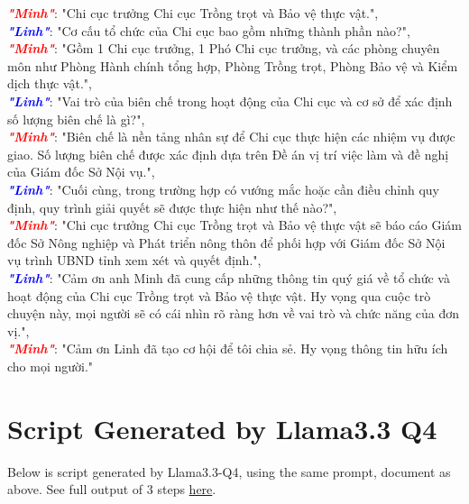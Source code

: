 \documentclass[12pt]{article}
\begin{document}
{\begin{minipage}{\textwidth}
\textcolor{red}{\textbf{\textit{"Minh"}}}: "Chi cục trưởng Chi cục Trồng trọt và Bảo vệ thực vật.",\\
\textcolor{blue}{\textbf{\textit{"Linh"}}}: "Cơ cấu tổ chức của Chi cục bao gồm những thành phần nào?",\\
\textcolor{red}{\textbf{\textit{"Minh"}}}: "Gồm 1 Chi cục trưởng, 1 Phó Chi cục trưởng, và các phòng chuyên môn như Phòng Hành chính tổng hợp, Phòng Trồng trọt, Phòng Bảo vệ và Kiểm dịch thực vật.",\\
\textcolor{blue}{\textbf{\textit{"Linh"}}}: "Vai trò của biên chế trong hoạt động của Chi cục và cơ sở để xác định số lượng biên chế là gì?",\\
\textcolor{red}{\textbf{\textit{"Minh"}}}: "Biên chế là nền tảng nhân sự để Chi cục thực hiện các nhiệm vụ được giao. Số lượng biên chế được xác định dựa trên Đề án vị trí việc làm và đề nghị của Giám đốc Sở Nội vụ.",\\
\textcolor{blue}{\textbf{\textit{"Linh"}}}: "Cuối cùng, trong trường hợp có vướng mắc hoặc cần điều chỉnh quy định, quy trình giải quyết sẽ được thực hiện như thế nào?",\\
\textcolor{red}{\textbf{\textit{"Minh"}}}: "Chi cục trưởng Chi cục Trồng trọt và Bảo vệ thực vật sẽ báo cáo Giám đốc Sở Nông nghiệp và Phát triển nông thôn để phối hợp với Giám đốc Sở Nội vụ trình UBND tỉnh xem xét và quyết định.",\\
\textcolor{blue}{\textbf{\textit{"Linh"}}}: "Cảm ơn anh Minh đã cung cấp những thông tin quý giá về tổ chức và hoạt động của Chi cục Trồng trọt và Bảo vệ thực vật. Hy vọng qua cuộc trò chuyện này, mọi người sẽ có cái nhìn rõ ràng hơn về vai trò và chức năng của đơn vị.",\\
\textcolor{red}{\textbf{\textit{"Minh"}}}: "Cảm ơn Linh đã tạo cơ hội để tôi chia sẻ. Hy vọng thông tin hữu ích cho mọi người."
\end{minipage}%
}

\section{Script Generated by Llama3.3 Q4}
Below is script generated by Llama3.3-Q4, using the same prompt, document as above. See full output of 3 steps \href{https://github.com/Minhsuperfragile/llm_repurpose/blob/main/podcast_creation/results/llama3.3_Q4_response.txt}{here}.
\end{document}
